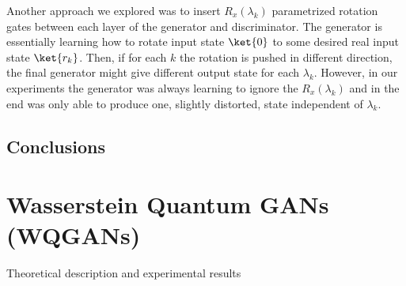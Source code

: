 Another approach we explored was to insert $R_x(\lambda_k)$ parametrized
rotation gates between each layer of the generator and discriminator. The
generator is essentially learning how to rotate input state $\ket{0}$ to some
desired real input state $\ket{r_k}$. Then, if for each $k$ the rotation is
pushed in different direction, the final generator might give different output
state for each $\lambda_k$. However, in our experiments the generator was always
learning to ignore the $R_x(\lambda_k)$ and in the end was only able to produce
one, slightly distorted, state independent of $\lambda_k$.

\subsection{Conclusions}


\section{Wasserstein Quantum GANs (WQGANs)}
Theoretical description and experimental results
  
